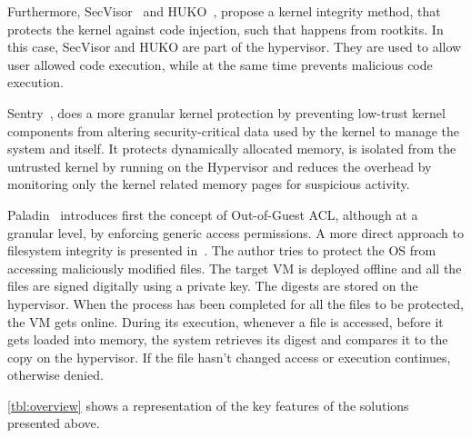 \par Furthermore, SecVisor~\cite{seshadri2007secvisor} and HUKO~\cite{xiong2011practical}, propose a kernel integrity method, that protects the kernel against code injection, such that happens from rootkits. In this case, SecVisor and HUKO are part of the hypervisor. They are used to allow user allowed code execution, while at the same time prevents malicious code execution.


\par Sentry~\cite{srivastava2012efficient}, does a more granular kernel protection by preventing low-trust kernel components from altering security-critical data used by the kernel to manage the system and itself. It protects dynamically allocated memory, is isolated from the untrusted kernel by running on the Hypervisor and reduces the overhead by monitoring only the kernel related memory pages for suspicious activity.


\par Paladin~\cite{baliga2008automated} introduces first the concept of Out-of-Guest \ac{ACL}, although at a granular level, by enforcing generic access permissions. A more direct approach to filesystem integrity is presented in~\cite{nasab2012security}. The author tries to protect the \ac{OS} from accessing maliciously modified files. The target \ac{VM} is deployed offline and all the files are signed digitally using a private key. The digests are stored on the hypervisor. When the process has been completed for all the files to be protected, the \ac{VM} gets online. During its execution, whenever a file is accessed, before it gets loaded into memory, the system retrieves its digest and compares it to the copy on the hypervisor. If the file hasn’t changed access or execution continues, otherwise denied.

\par \ref{tbl:overview} shows a representation of the key features of the solutions presented above.

